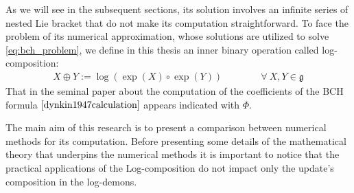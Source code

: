 As we will see in the subsequent sections, its solution involves an infinite series of nested Lie bracket that do not make its computation straightforward. 
To face the problem of its numerical approximation, whose solutions are utilized to solve \ref{eq:bch_problem}, we define in this thesis an inner binary operation called log-composition:
\begin{align*}
X \oplus Y := \log(\exp(X)\circ\exp( Y))
\qquad \qquad
\forall ~X, Y \in \mathfrak{g}
\end{align*}
That in the seminal paper about the computation of the coefficients of the BCH formula $\cite{dynkin1947calculation}$ appears indicated with $\Phi$.

The main aim of this research is to present a comparison between numerical methods for its computation.
Before presenting some details of the mathematical theory that underpins the numerical methods it is important to notice that the practical applications of the Log-composition do not impact only the update's composition in the log-demons.

